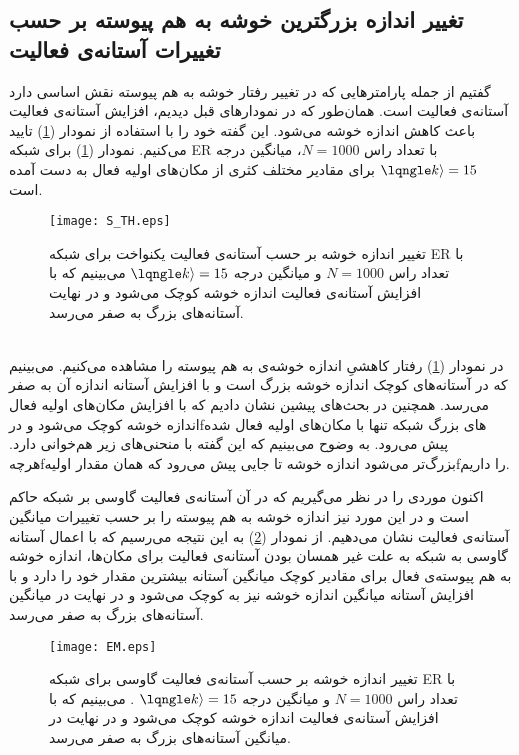 \subsection{تغییر اندازه بزرگترین خوشه به هم پیوسته بر حسب تغییرات آستانه‌ی فعالیت}
گفتیم از جمله پارامتر‌هایی که در تغییر رفتار خوشه به هم پیوسته نقش اساسی دارد آستانه‌ی فعالیت است. همان‌طور که در نمودار‌های قبل دیدیم، افزایش آستانه‌ی فعالیت باعث کاهش اندازه خوشه می‌شود. این گفته خود را با استفاده از نمودار (\ref{fig:SM})   تایید می‌کنیم. نمودار (\ref{fig:SM})  برای شبکه ER با تعداد راس $N = 1000$، میانگین درجه $\lqngle k \rangle = 15$ برای مقادیر مختلف کثری از مکان‌های اولیه فعال به دست آمده است. 
\begin{figure}[htbp]
\hspace*{0cm}
\centering
\texttt{[image: S\_TH.eps]}
\caption [تغییر اندازه خوشه بر حسب آستانه‌ی فعالیت برای شبکه ER با آستانه‌ی فعالیت یکنواخت]{\footnotesize تغییر اندازه خوشه بر حسب آستانه‌ی فعالیت یکنواخت برای شبکه ER با تعداد راس $N = 1000$ و میانگین درجه $\lqngle k \rangle = 15$  می‌بینیم که با افزایش آستانه‌ی فعالیت اندازه خوشه کوچک می‌شود و در نهایت آستانه‌های بزرگ به صفر می‌رسد. }
\label{fig:SM}
\end{figure}\\
در نمودار (\ref{fig:SM}) رفتار کاهشیِ اندازه خوشه‌ی به هم پیوسته را مشاهده می‌کنیم. می‌بینیم که در آستانه‌های کوچک اندازه خوشه بزرگ است و با افزایش آستانه اندازه آن به صفر می‌رسد.  همچنین در بحث‌های پیشین  نشان دادیم که با افزایش مکان‌های اولیه فعال اندازه خوشه کوچک می‌شود و درfهای بزرگ شبکه تنها با مکان‌های اولیه فعال شده پیش می‌رود. به وضوح می‌بینیم که این گفته با  منحنی‌های زیر هم‌خوانی دارد. هرچهfبزرگ‌تر می‌شود اندازه خوشه تا جایی پیش می‌رود که همان مقدار اولیهfرا داریم.  

اکنون موردی را در نظر می‌گیریم که در آن آستانه‌ی فعالیت گاوسی بر شبکه حاکم است و در این مورد نیز اندازه خوشه به هم پیوسته را بر حسب تغییرات میانگین آستانه‌ی فعالیت نشان می‌دهیم. از نمودار 
(\ref{fig:EM1})  به این نتیجه می‌رسیم که با اعمال آستانه گاوسی به شبکه به علت غیر همسان بودن آستانه‌ی فعالیت برای مکان‌ها، اندازه خوشه به هم پیوسته‌ی فعال برای مقادیر کوچک میانگین آستانه بیشترین مقدار خود را دارد و با افزایش آستانه میانگین اندازه خوشه نیز به کوچک می‌شود و در نهایت در میانگین آستانه‌های بزرگ به صفر می‌رسد.  
\begin{figure}[htbp]
\hspace*{0cm}
\centering
\texttt{[image: EM.eps]}
\caption [تغییر اندازه خوشه بر حسب آستانه‌ی فعالیت برای شبکه ER با آستانه گاوسی]{\footnotesize تغییر اندازه خوشه بر حسب آستانه‌ی فعالیت گاوسی برای شبکه ER با تعداد راس $N = 1000$ و میانگین درجه $\lqngle k \rangle = 15$ . می‌بینیم که با افزایش آستانه‌ی فعالیت اندازه خوشه کوچک می‌شود و در نهایت در میانگین آستانه‌های بزرگ به صفر می‌رسد. }
\label{fig:EM1}
\end{figure}

